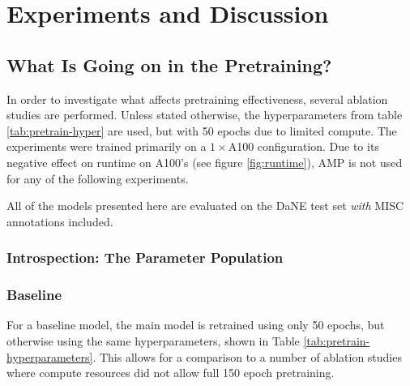 \documentclass[main.tex]{subfiles}
\begin{document}
\chapter{Experiments and Discussion}

\section{What Is Going on in the Pretraining?}
\label{sec:pretrainpls}
In order to investigate what affects pretraining effectiveness, several ablation studies are performed.
Unless stated otherwise, the hyperparameters from table \ref{tab:pretrain-hyper} are used, but with 50 epochs due to limited compute.
The experiments were trained primarily on a $ 1\times$A100 configuration.
Due to its negative effect on runtime on A100's (see figure \ref{fig:runtime}), AMP is not used for any of the following experiments.

All of the models presented here are evaluated on the DaNE test set \emph{with} MISC annotations included.

\subsection{Introspection: The Parameter Population}

\subsection{Baseline}
For a baseline model, the main model is retrained using only 50 epochs, but otherwise using the same hyperparameters, shown in Table \ref{tab:pretrain-hyperparameters}.
This allows for a comparison to a number of ablation studies where compute resources did not allow full 150 epoch pretraining.
\end{document}
